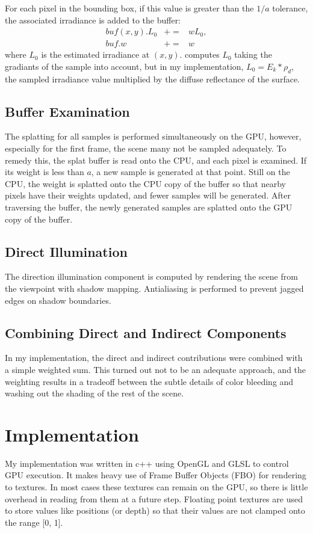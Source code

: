 \documentclass[10pt,twopage]{acmsiggraph}
\begin{document}
For each pixel in the bounding box, if this value is greater than the $1/a$ tolerance, the associated irradiance is added to the buffer: 
\begin{eqnarray*}
buf(x,y).L_0 &+=& wL_0,  \\
buf.w &+=& w
\end{eqnarray*}
where $L_0$ is the estimated irradiance at $(x,y)$.  \cite{mainpaper} computes $L_0$ taking the gradiants of the sample into account, but in my implementation, $L_0 = E_k*\rho_d$, the sampled irradiance value multiplied by the diffuse reflectance of the surface.  

\subsection{Buffer Examination}
The splatting for all samples is performed simultaneously on the GPU, however, especially for the first frame, the scene many not be sampled adequately.  To remedy this, the splat buffer is read onto the CPU, and each pixel is examined.  If its weight is less than $a$, a new sample is generated at that point.  Still on the CPU, the weight is splatted onto the CPU copy of the buffer so that nearby pixels have their weights updated, and fewer samples will be generated.  After traversing the buffer, the newly generated samples are splatted onto the GPU copy of the buffer.

\subsection{Direct Illumination}
The direction illumination component is computed by rendering the scene from the viewpoint with shadow mapping.  Antialiasing is performed to prevent jagged edges on shadow boundaries.

\subsection{Combining Direct and Indirect Components}
In my implementation, the direct and indirect contributions were combined with a simple weighted sum.  This turned out not to be an adequate approach, and the weighting results in a tradeoff between the subtle details of color bleeding and washing out the shading of the rest of the scene.

\section{Implementation}
My implementation was written in c++ using OpenGL and GLSL to control GPU execution.  It makes heavy use of Frame Buffer Objects (FBO) for rendering to textures.  In most cases these textures can remain on the GPU, so there is little overhead in reading from them at a future step.  Floating point textures are used to store values like positions (or depth) so that their values are not clamped onto the range [0, 1].
\end{document}

